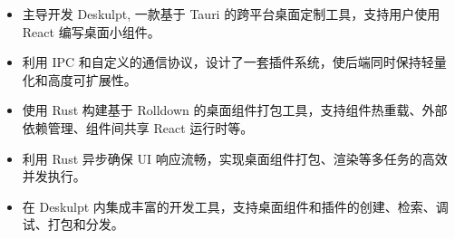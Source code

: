 


\begin{itemize}[nosep]
  \item 主导开发 Deskulpt, 一款基于 Tauri 的跨平台桌面定制工具，支持用户使用 React 编写桌面小组件。
  \item 利用 IPC 和自定义的通信协议，设计了一套插件系统，使后端同时保持轻量化和高度可扩展性。
  \item 使用 Rust 构建基于 Rolldown 的桌面组件打包工具，支持组件热重载、外部依赖管理、组件间共享 React 运行时等。
  \item 利用 Rust 异步确保 UI 响应流畅，实现桌面组件打包、渲染等多任务的高效并发执行。
  \item 在 Deskulpt 内集成丰富的开发工具，支持桌面组件和插件的创建、检索、调试、打包和分发。
\end{itemize}
